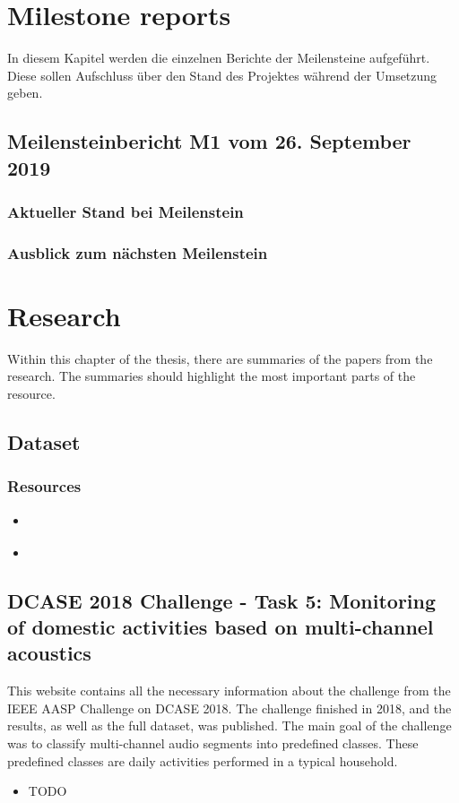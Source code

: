\chapter{Milestone reports}
\label{app:Milestone-Reports}
In diesem Kapitel werden die einzelnen Berichte der Meilensteine aufgeführt. Diese sollen Aufschluss über den Stand des
Projektes während der Umsetzung geben.

\section{Meilensteinbericht M1 vom 26. September 2019}

\subsection{Aktueller Stand bei Meilenstein}

\subsection{Ausblick zum nächsten Meilenstein}

\chapter{Research}
\label{app:Research}
Within this chapter of the thesis, there are summaries of the papers from the research. The summaries should highlight the most important parts of the resource.

\section{Dataset}
\label{sec:Research-Dataset}

\subsection{Resources}
\begin{itemize}
    \item \cite{dekkers_sins_2017}
    \item \cite{dekkers_dcase_2018}
\end{itemize}

\section{DCASE 2018 Challenge - Task 5: Monitoring of domestic activities based on multi-channel acoustics }
This website contains all the necessary information about the challenge from the IEEE AASP Challenge on \gls{DCASE} 2018. The challenge finished in 2018, and the results, as well as the full dataset, was published. The main goal of the challenge was to classify multi-channel audio segments into predefined classes. These predefined classes are daily activities performed in a typical household.
\begin{itemize}
    \item TODO
\end{itemize}

